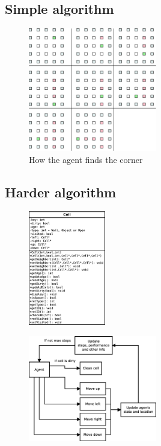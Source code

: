 \subsection{Simple algorithm}


\begin{figure}[h] \label{fig:corner}	\centering
\includegraphics[width=0.5\textwidth]{find_corner}
\caption{How the agent finds the corner}
\end{figure}


\subsection{Harder algorithm}


\begin{figure}[h] \label{fig:}	\centering
\includegraphics[width=0.3\textwidth]{cell_uml}
\caption{}
\end{figure}

\begin{figure}[h] \label{fig:}	\centering
\includegraphics[width=0.5\textwidth]{agent}
\caption{}
\end{figure}




